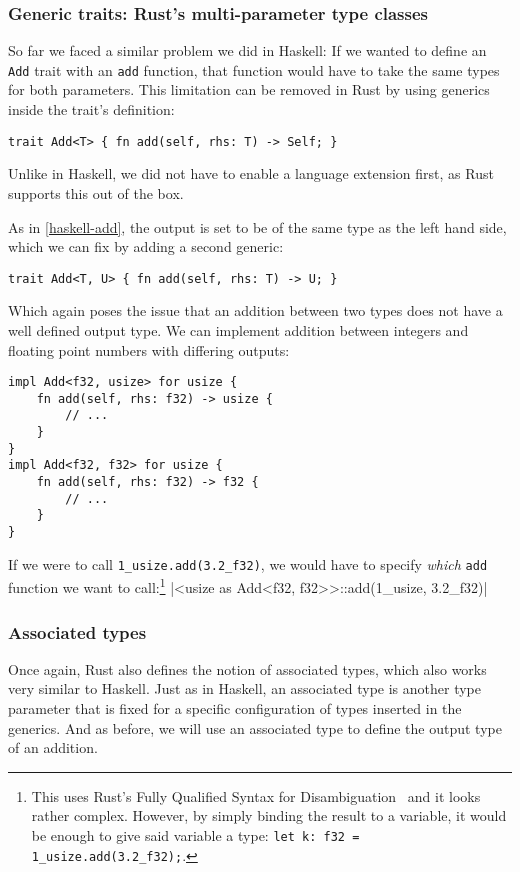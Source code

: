 \subsubsection{Generic traits: Rust's multi-parameter type classes}

So far we faced a similar problem we did in Haskell: If we wanted to define an \verb|Add| trait with an \verb|add| function, that function would have to take the same types for both parameters. This limitation can be removed in Rust by using generics inside the trait's definition:
\begin{verbatim}
trait Add<T> { fn add(self, rhs: T) -> Self; }
\end{verbatim}
Unlike in Haskell, we did not have to enable a language extension first, as Rust supports this out of the box.

As in \autoref{haskell-add}, the output is set to be of the same type as the left hand side, which we can fix by adding a second generic:
\begin{verbatim}
trait Add<T, U> { fn add(self, rhs: T) -> U; }
\end{verbatim}
Which again poses the issue that an addition between two types does not have a well defined output type. We can implement addition between integers and floating point numbers with differing outputs:
\begin{verbatim}
impl Add<f32, usize> for usize {
    fn add(self, rhs: f32) -> usize {
        // ...
    }
}
impl Add<f32, f32> for usize {
    fn add(self, rhs: f32) -> f32 {
        // ...
    }
}
\end{verbatim}
If we were to call \verb|1_usize.add(3.2_f32)|, we would have to specify \textit{which} \verb|add| function we want to call:\footnote{This uses Rust's Fully Qualified Syntax for Disambiguation~\cite{rust-book} and it looks rather complex. However, by simply binding the result to a variable, it would be enough to give said variable a type: \verb|let k: f32 = 1_usize.add(3.2_f32);|.}
|<usize as Add<f32, f32>>::add(1_usize, 3.2_f32)|

\subsubsection{Associated types}\label{rust-associated-types}

Once again, Rust also defines the notion of associated types, which also works very similar to Haskell. Just as in Haskell, an associated type is another type parameter that is fixed for a specific configuration of types inserted in the generics. And as before, we will use an associated type to define the output type of an addition.

